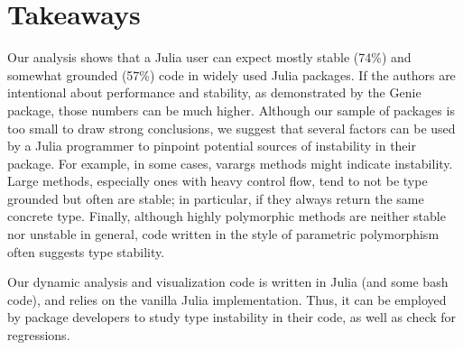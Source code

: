 \section{Takeaways}

Our analysis shows that a Julia user can expect mostly stable (74\%) and
somewhat grounded (57\%) code in widely used Julia packages. If the authors
are intentional about performance and stability, as demonstrated by the Genie
package, those numbers can be much higher. Although our sample of packages is
too small to draw strong conclusions, we suggest that several factors can be
used by a Julia programmer to pinpoint potential sources of instability in their
package. For example, in some cases, varargs methods might indicate instability.
Large methods, especially ones with heavy control flow,
tend to not be type grounded but often are stable; in particular,
if they always return the same concrete type.
Finally, although highly polymorphic methods are neither stable nor unstable
in general, code written in the style of parametric polymorphism
often suggests type stability.

Our dynamic analysis and visualization code is written in Julia (and some bash
code), and relies on the vanilla Julia implementation. Thus, it can be employed
by package developers to study type instability in their code, as well as check
for regressions.
